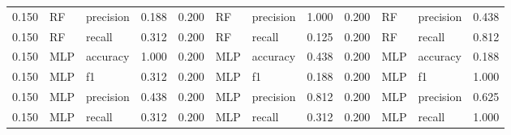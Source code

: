 \begin{tabular}{rllrrllrrllr}
0.150 & RF & precision & 0.188 & 0.200 & RF & precision & 1.000 & 0.200 & RF & precision & 0.438 \\
0.150 & RF & recall & 0.312 & 0.200 & RF & recall & 0.125 & 0.200 & RF & recall & 0.812 \\
0.150 & MLP & accuracy & 1.000 & 0.200 & MLP & accuracy & 0.438 & 0.200 & MLP & accuracy & 0.188 \\
0.150 & MLP & f1 & 0.312 & 0.200 & MLP & f1 & 0.188 & 0.200 & MLP & f1 & 1.000 \\
0.150 & MLP & precision & 0.438 & 0.200 & MLP & precision & 0.812 & 0.200 & MLP & precision & 0.625 \\
0.150 & MLP & recall & 0.312 & 0.200 & MLP & recall & 0.312 & 0.200 & MLP & recall & 1.000 \\
\bottomrule
\end{tabular}
